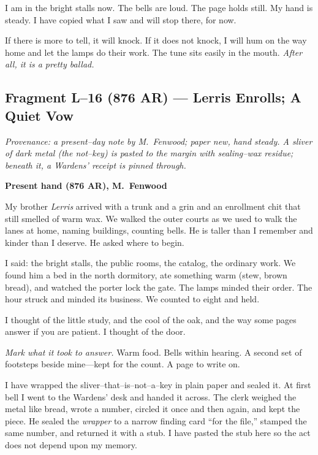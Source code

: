 \documentclass[11pt]{article}
\numberwithin{equation}{section} %
\theoremstyle{plain} %
\theoremstyle{definition} %
\theoremstyle{remark} %
\begin{document}
I am in the bright stalls now. The bells are loud. The page holds still. My hand is steady. I have copied what I saw and will stop there, for now.

If there is more to tell, it will knock. If it does not knock, I will hum on the way home and let the lamps do their work. The tune sits easily in the mouth. \emph{After all, it is a pretty ballad.}

\subsection{Fragment L--16 (876 AR) — Lerris Enrolls; A Quiet Vow}
\label{frag:l16}

\noindent\textit{Provenance: a present–day note by M.\ Fenwood; paper new, hand steady. A sliver of dark metal (the not–key) is pasted to the margin with sealing–wax residue; beneath it, a Wardens’ receipt is pinned through.}

\medskip
\noindent\textbf{Present hand (876 AR), M.\ Fenwood}

My brother \textit{Lerris} arrived with a trunk and a grin and an enrollment chit that still smelled of warm wax. We walked the outer courts as we used to walk the lanes at home, naming buildings, counting bells. He is taller than I remember and kinder than I deserve. He asked where to begin.

I said: the bright stalls, the public rooms, the catalog, the ordinary work. We found him a bed in the north dormitory, ate something warm (stew, brown bread), and watched the porter lock the gate. The lamps minded their order. The hour struck and minded its business. We counted to eight and held.

I thought of the little study, and the cool of the oak, and the way some pages answer if you are patient. I thought of the door.

\medskip
\noindent\textit{Mark what it took to answer.} Warm food. Bells within hearing. A second set of footsteps beside mine—kept for the count. A page to write on.

I have wrapped the sliver–that–is–not–a–key in plain paper and sealed it. At first bell I went to the Wardens’ desk and handed it across. The clerk weighed the metal like bread, wrote a number, circled it once and then again, and kept the piece. He sealed the \emph{wrapper} to a narrow finding card “for the file,” stamped the same number, and returned it with a stub. I have pasted the stub here so the act does not depend upon my memory.
\end{document}
